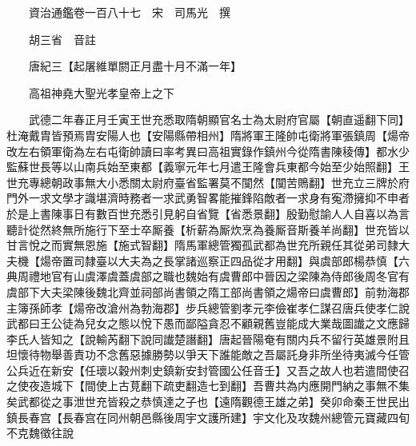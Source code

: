 










 


 
 


 

  
  
  
  
  





  
  
  
  
  
 
  

  

  
  
  



  

 
 

  
   




  

  
  


  　　資治通鑑卷一百八十七　宋　司馬光　撰

　　胡三省　音註

　　唐紀三【起屠維單閼正月盡十月不滿一年】

　　高祖神堯大聖光孝皇帝上之下

　　武德二年春正月壬寅王世充悉取隋朝顯官名士為太尉府官屬【朝直遥翻下同】杜淹戴胄皆預焉胄安陽人也【安陽縣帶相州】隋將軍王隆帥屯衛將軍張鎮周【煬帝改左右領軍衛為左右屯衛帥讀曰率考異曰高祖實錄作鎮州今從隋書陳稜傳】都水少監蘇世長等以山南兵始至東都【義寧元年七月遣王隆會兵東都今始至少始照翻】王世充專總朝政事無大小悉關太尉府臺省監署莫不闃然【闃苦鵙翻】世充立三牌於府門外一求文學才識堪濟時務者一求武勇智畧能摧鋒陷敵者一求身有寃滯擁抑不申者於是上書陳事日有數百世充悉引見躬自省覽【省悉景翻】殷勤慰諭人人自喜以為言聽計從然終無所施行下至士卒厮養【析薪為厮炊烹為養厮音斯養羊尚翻】世充皆以甘言悅之而實無恩施【施式智翻】隋馬軍總管獨孤武都為世充所親任其從弟司隸大夫機【煬帝置司隸臺以大夫為之長掌諸巡察正四品從才用翻】與虞部郎楊恭慎【六典周禮地官有山虞澤虞蓋虞部之職也魏始有虞曹郎中晉因之梁陳為侍郎後周冬官有虞部下大夫梁陳後魏北齊並祠部尚書領之隋工部尚書領之煬帝曰虞曹郎】前勃海郡主簿孫師孝【煬帝改滄州為勃海郡】步兵總管劉孝元李儉崔孝仁謀召唐兵使孝仁說武都曰王公徒為兒女之態以悅下愚而鄙隘貪忍不顧親舊豈能成大業哉圖䜟之文應歸李氏人皆知之【說輸芮翻下說同䜟楚譖翻】唐起晉陽奄有關内兵不留行英雄景附且坦懷待物舉善責功不念舊惡據勝勢以爭天下誰能敵之吾屬託身非所坐待夷滅今任管公兵近在新安【任瓌以穀州刺史鎮新安封管國公任音壬】又吾之故人也若遣間使召之使夜造城下【間使上古莧翻下疏吏翻造七到翻】吾曹共為内應開門納之事無不集矣武都從之事泄世充皆殺之恭慎達之子也【遠隋觀德王雄之弟】癸卯命秦王世民出鎮長春宫【長春宫在同州朝邑縣後周宇文護所建】宇文化及攻魏州總管元寶藏四旬不克魏徵往說

